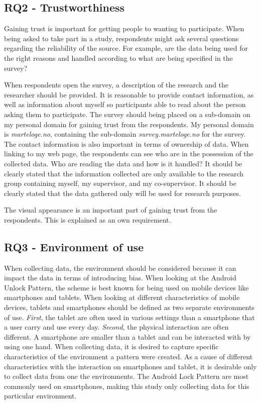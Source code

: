     \subsection*{RQ2 - Trustworthiness}
    Gaining trust is important for getting people to wanting to participate. When being asked to take part in a study, respondents might ask several questions regarding the reliability of the source. For example, are the data being used for the right reasons and handled according to what are being specified in the survey? 

    When respondents open the survey, a description of the research and the researcher should be provided. It is reasonable to provide contact information, as well as information about myself so participants able to read about the person asking them to participate. The survey should being placed on a sub-domain on my personal domain for gaining trust from the respondents. My personal domain is {\it marteloge.no}, containing the sub-domain {\it survey.marteloge.no} for the survey.  The contact information is also important in terms of ownership of data. When linking to my web page, the respondents can see who are in the possession of the collected data. Who are reading the data and how is it handled? It should be clearly stated that the information collected are only available to the research group containing myself, my supervisor, and my co-supervisor. It should be clearly stated that the data gathered only will be used for research purposes.

    The visual appearance is an important part of gaining trust from the respondents. This is explained as an own requirement. 

    \subsection*{RQ3 - Environment of use}
    When collecting data, the environment should be considered because it can impact the data in terms of introducing bias. When looking at the Android Unlock Pattern, the scheme is best known for being used on mobile devices like smartphones and tablets. When looking at different characteristics of mobile devices, tablets and smartphones should be defined as two separate environments of use. {\it First}, the tablet are often used in various settings than a smartphone that a user carry and use every day. {\it Second}, the physical interaction are often different. A smartphone are smaller than a tablet and can be interacted with by using one hand. When collecting data, it is desired to capture specific characteristics of the environment a pattern were created. As a cause of different characteristics with the interaction on smartphones and tablet, it is desirable only to collect data from one the environments. The Android Lock Pattern are most commonly used on smartphones, making this study only collecting data for this particular environment.

